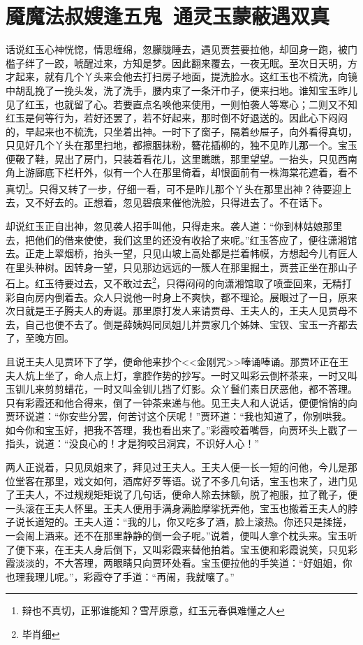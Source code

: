 \documentclass[12pt,oneside]{book}
\begin{document}
 
\chapter{魇魔法叔嫂逢五鬼~通灵玉蒙蔽遇双真}
话说红玉心神恍惚，情思缠绵，忽朦胧睡去，遇见贾芸要拉他，却回身一跑，被门槛子绊了一跤，唬醒过来，方知是梦。因此翻来覆去，一夜无眠。至次日天明，方才起来，就有几个丫头来会他去打扫房子地面，提洗脸水。这红玉也不梳洗，向镜中胡乱挽了一挽头发，洗了洗手，腰内束了一条汗巾子，便来扫地。谁知宝玉昨儿见了红玉，也就留了心。若要直点名唤他来使用，一则怕袭人等寒心；二则又不知红玉是何等行为，若好还罢了，若不好起来，那时倒不好退送的。因此心下闷闷的，早起来也不梳洗，只坐着出神。一时下了窗子，隔着纱屉子，向外看得真切，只见好几个丫头在那里扫地，都擦胭抹粉，簪花插柳的，独不见昨儿那一个。宝玉便靸了鞋，晃出了房门，只装着看花儿，这里瞧瞧，那里望望。一抬头，只见西南角上游廊底下栏杆外，似有一个人在那里倚着，却恨面前有一株海棠花遮着，看不真切\footnote{辩也不真切，正邪谁能知？雪芹原意，红玉元春俱难懂之人}。只得又转了一步，仔细一看，可不是昨儿那个丫头在那里出神？待要迎上去，又不好去的。正想着，忽见碧痕来催他洗脸，只得进去了。不在话下。

却说红玉正自出神，忽见袭人招手叫他，只得走来。袭人道：“你到林姑娘那里去，把他们的借来使使，我们这里的还没有收拾了来呢。”红玉答应了，便往潇湘馆去。正走上翠烟桥，抬头一望，只见山坡上高处都是拦着帏幙，方想起今儿有匠人在里头种树。因转身一望，只见那边远远的一簇人在那里掘土，贾芸正坐在那山子石上。红玉待要过去，又不敢过去\footnote{毕肖细}，只得闷闷的向潇湘馆取了喷壶回来，无精打彩自向房内倒着去。众人只说他一时身上不爽快，都不理论。展眼过了一日，原来次日就是王子腾夫人的寿诞。那里原打发人来请贾母、王夫人的，王夫人见贾母不去，自己也便不去了。倒是薛姨妈同凤姐儿并贾家几个姊妹、宝钗、宝玉一齐都去了，至晚方回。

且说王夫人见贾环下了学，便命他来抄个<<金刚咒>>唪诵唪诵。那贾环正在王夫人炕上坐了，命人点上灯，拿腔作势的抄写。一时又叫彩云倒杯茶来，一时又叫玉钏儿来剪剪蜡花，一时又叫金钏儿挡了灯影。众丫鬟们素日厌恶他，都不答理。只有彩霞还和他合得来，倒了一钟茶来递与他。见王夫人和人说话，便便悄悄的向贾环说道：“你安些分罢，何苦讨这个厌呢！”贾环道：“我也知道了，你别哄我。如今你和宝玉好，把我不答理，我也看出来了。”彩霞咬着嘴唇，向贾环头上戳了一指头，说道：“没良心的！才是狗咬吕洞宾，不识好人心！”

两人正说着，只见凤姐来了，拜见过王夫人。王夫人便一长一短的问他，今儿是那位堂客在那里，戏文如何，酒席好歹等语。说了不多几句话，宝玉也来了，进门见了王夫人，不过规规矩矩说了几句话，便命人除去抹额，脱了袍服，拉了靴子，便一头滚在王夫人怀里。王夫人便用手满身满脸摩挲抚弄他，宝玉也搬着王夫人的脖子说长道短的。王夫人道：“我的儿，你又吃多了酒，脸上滚热。你还只是揉搓，一会闹上酒来。还不在那里静静的倒一会子呢。”说着，便叫人拿个枕头来。宝玉听了便下来，在王夫人身后倒下，又叫彩霞来替他拍着。宝玉便和彩霞说笑，只见彩霞淡淡的，不大答理，两眼睛只向贾环处看。宝玉便拉他的手笑道：“好姐姐，你也理我理儿呢。”，彩霞夺了手道：“再闹，我就嚷了。”
\end{document}
